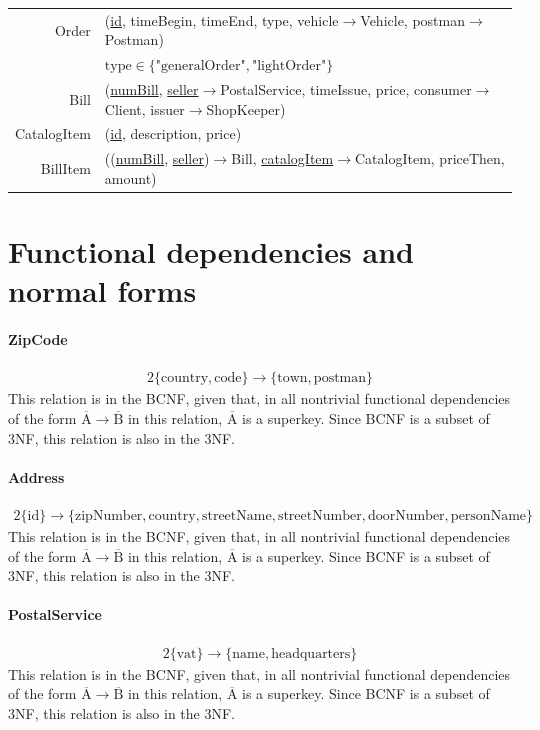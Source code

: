 \documentclass{report}[a4paper]
\theoremstyle{remark}
\begin{document}
\begin{center}
\begin{tabular}{r p{144mm}}
        Order           & (\uline{id}, timeBegin, timeEnd, type, vehicle$\rightarrow$Vehicle, postman$\rightarrow$Postman) \\
                        & $\text{type} \in \{\text{"generalOrder"}, \text{"lightOrder"}\}$\\
        Bill            & (\uline{numBill}, \uline{seller}$\rightarrow$PostalService, timeIssue, price, consumer$\rightarrow$Client, issuer$\rightarrow$ShopKeeper)                                   \\
        CatalogItem     & (\uline{id}, description, price)                           \\
        BillItem        & ((\uline{numBill}, \uline{seller})$\rightarrow$Bill, \uline{catalogItem}$\rightarrow$CatalogItem, priceThen, amount)
    \end{tabular}
\end{center}
\chapter{Functional dependencies and normal forms}
\subsubsection{ZipCode}
\begin{alignat*}{2}
\{\text{country},\text{code}\} \rightarrow \{\text{town}, \text{postman}\}
\end{alignat*}
This relation is in the BCNF, given that, in all nontrivial functional dependencies of the form $\overline{\text{A}} \rightarrow \overline{\text{B}}$ in this relation, $\overline{\text{A}}$ is a superkey. Since BCNF is a subset of 3NF, this relation is also in the 3NF.
\subsubsection{Address}
\begin{alignat*}{2}
\{\text{id}\} \rightarrow \{\text{zipNumber}, \text{country}, \text{streetName}, \text{streetNumber}, \text{doorNumber}, \text{personName}\}
\end{alignat*}
This relation is in the BCNF, given that, in all nontrivial functional dependencies of the form $\overline{\text{A}} \rightarrow \overline{\text{B}}$ in this relation, $\overline{\text{A}}$ is a superkey. Since BCNF is a subset of 3NF, this relation is also in the 3NF.
\subsubsection{PostalService}
\begin{alignat*}{2}
\{\text{vat}\} \rightarrow \{\text{name},\text{headquarters}\}
\end{alignat*}
This relation is in the BCNF, given that, in all nontrivial functional dependencies of the form $\overline{\text{A}} \rightarrow \overline{\text{B}}$ in this relation, $\overline{\text{A}}$ is a superkey. Since BCNF is a subset of 3NF, this relation is also in the 3NF.
\end{document}
